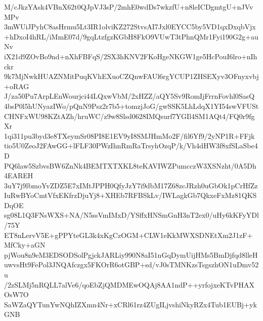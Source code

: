 M/cJkzYAsk4VBnX62t0QJpVJ3sP/2mhE0wdDs7wkzfU+n8leICDgmtgU+nJVvMPv
3mWUiJPyhC8asHrmu5Lt3IR1olviKZ272StvsAI7Jxl0EYCC5by5VD1qxDxqbVjx
+hDxoI4hRL/iMmE07d/9gqLtzfgzKGbH8FkO9VUwT3tPhnQMr1Fyi190G2g+auNv
iX21d9ZOvBo9nd+nXhFBFqS/2SX3hKNV2FKoHgeNKGW1ge5HcPouI6lro+nIhckr
9k7MjNwkHUAZNMitPuqKVhEXuoCZQnwFAUl6rgYCUP1ZHSEXyv3OFnyxvbj+oRAG
J/za50Pu7ArpLEnWourjci44LQxwVbM/2xHZZ/aQY5Sv9RomIjFrrnFovhl0SasQ
4bsP0l5hUNyazIWo/pQnN9Psz2r7b5+tomzjJoG/gwSSK5LhLdqX1YI54swVFUSt
CHNFxWU98KZtAZh/hruWC/z9w8Slsd0628IMQsurf7YGIl4SM1AQt4/FQ0r9fgXr
1qi311pu3byd3e8TXeymSr08PI8E1EV9yI8SMJHmMo2F/fil6Yf9/2yNP1R+FFjk
tio5U0ZeoJ2FAwGG+lFLF30PWzIhnRmRaTrsyhOzqP/k/Vh4dHW3f8xfSLaSbe4D
PQ6law5SzbvsBW6ZnNk4BEMTXTXKL8teKAVIWZPumcczW3XSNzht/0A5Dh4EAREH
3uY7j9lbmoYvZDZ5E7xIMtJPPH0QfyJzY7i9dbM17Z68zcJRzh0uGbOk1pCrHfZz
IuRwBYoCmtVfxEKfrzDjuYj8+XHEb7RFBSkLv/IWLagkGb7QkxeFxMz81QKSDqOE
sg08L1Q3FNsWXS+NA/N5ssVmIMxD/YSffxHNSmGnH3nT2ex0/uHy6kKFyYDl/75Y
ET8nLervV5E+gPPYteGL3k4xKgCzOGM+CLW1eKkMWXSDNEtXm2J1zF+MfCky+aGN
pjWou8n9eM3EDSODSolPgjckJARLiy990N8aI51nGqDymUijHMs5BmDjfqd8lleH
uwvsHt9FePol3JNQAfczgx5FKOrR6otGBP+sd/vJ0sTMNKzsTsgszhON1uDmv52u
/2zSLMj5nRQLL7alVe6/qoEbZjQMDMEwOQAj8AA1ndP++yrfojxeKTvPHAXOsW7O
SaWZaQYTunYwNQhIZXmn4Nr+xCRl61rz4ZUgILjvshiNkyRZx4Tub1EUBj+ykGNB
